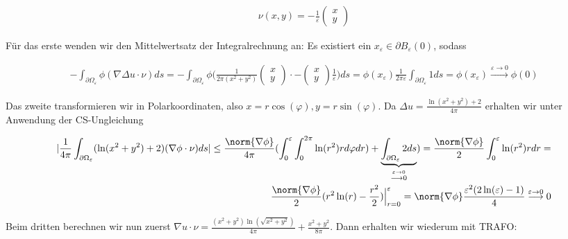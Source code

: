 \begin{solution}
\begin{align*}
  \nu(x,y)
  =
  -\frac{1}{\varepsilon}
  \left(\begin{array}{c}
    x \\
    y
  \end{array}\right)
\end{align*}

Für das erste wenden wir den Mittelwertsatz der Integralrechnung an: Es existiert
ein $x_\varepsilon \in \partial B_\varepsilon(0)$, sodass

\begin{align*}
  -\int_{\partial \Omega_\varepsilon} \phi (\nabla \Delta u \cdot \nu) ds
  =
  -\int_{\partial \Omega_\varepsilon} \phi
  \Big(\frac{1}{2\pi (x^2+y^2)}
  \begin{pmatrix} x \\ y \end{pmatrix} \cdot
  - \begin{pmatrix} x \\ y \end{pmatrix}
  \frac{1}{\varepsilon}\Big) ds
  =
  \phi(x_\varepsilon) \frac{1}{2\pi \varepsilon} \int_{\partial \Omega_\varepsilon} 1 ds
  =
  \phi(x_\varepsilon)
  \stackrel{\varepsilon \rightarrow 0}{\longrightarrow}
  \phi(0)
\end{align*}

Das zweite transformieren wir in Polarkoordinaten, also $x = r\cos(\varphi), y = r\sin(\varphi)$.
Da $\Delta u = \frac{\ln(x^2 +y^2) + 2}{4 \pi}$ erhalten wir unter Anwendung der CS-Ungleichung

\begin{align*}
  |\frac{1}{4\pi} \int_{\partial \Omega_\varepsilon} (\ln(x^2 + y^2) + 2) (\nabla \phi \cdot \nu) ds|
  \leq
  \frac{\norm{\nabla \phi}}{4 \pi} (\int_0^\varepsilon \int_0^{2 \pi} \ln(r^2) r d\varphi dr) + \underbrace{\int_{\partial \Omega_\varepsilon} 2 ds}_{\stackrel{\varepsilon \rightarrow 0}{\longrightarrow 0}})
  =
  \frac{\norm{\nabla \phi}}{2} \int_0^\varepsilon \ln(r^2) r dr
  = \\
  \frac{\norm{\nabla \phi}}{2} (r^2\ln(r) - \frac{r^2}{2})\Big|_{r = 0}^\varepsilon
  =
  \norm{\nabla \phi}\frac{\varepsilon^2(2\ln(\varepsilon)-1)}{4}
  \stackrel{\varepsilon \rightarrow 0}{\longrightarrow}
  0
\end{align*}

Beim dritten berechnen wir nun zuerst $\nabla u \cdot \nu = \frac{(x^2+y^2)\ln(\sqrt{x^2+y^2})}{4\pi}+\frac{x^2+y^2}{8\pi}$.
Dann erhalten wir wiederum mit TRAFO:


\end{solution}
